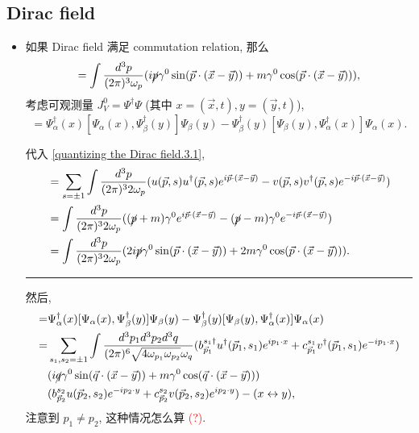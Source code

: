 \subsection{Dirac field}
\begin{itemize}
	\item 如果 Dirac field 满足 commutation relation, 那么
	\begin{equation}
		[\Psi(\vec{x}, t), \Psi^\dag(\vec{y}, t)] = \int \frac{d^3 p}{(2 \pi)^3 \omega_p} (i \cancel{p} \gamma^0 \sin(\vec{p} \cdot (\vec{x} - \vec{y})) + m \gamma^0 \cos(\vec{p} \cdot (\vec{x} - \vec{y}))),
	\end{equation}
	考虑可观测量 $J_V^0 = \Psi^\dag \Psi$ (其中 $x = (\vec{x}, t), y = (\vec{y}, t)$),
	\begin{equation}
		[J_V^0(x), J_V^0(y)] = \Psi^\dag_\alpha(x) [\Psi_\alpha(x), \Psi^\dag_\beta(y)] \Psi_\beta(y) - \Psi^\dag_\beta(y) [\Psi_\beta(y), \Psi^\dag_\alpha(x)] \Psi_\alpha(x).
	\end{equation}
	
	\begin{tcolorbox}[title=calculation:]
		代入 \eqref{quantizing the Dirac field.3.1},
		\begin{align}
			[\Psi(\vec{x}, t), \Psi^\dag(\vec{y}, t)] &= \sum_{s = \pm 1} \int \frac{d^3 p}{(2 \pi)^3 2 \omega_p} (u(\vec{p}, s) u^\dag(\vec{p}, s) e^{i \vec{p} \cdot (\vec{x} - \vec{y})} - v(\vec{p}, s) v^\dag(\vec{p}, s) e^{- i \vec{p} \cdot (\vec{x} - \vec{y})}) \notag \\
			&= \int \frac{d^3 p}{(2 \pi)^3 2 \omega_p} ((\cancel{p} + m) \gamma^0 e^{i \vec{p} \cdot (\vec{x} - \vec{y})} - (\cancel{p} - m) \gamma^0 e^{- i \vec{p} \cdot (\vec{x} - \vec{y})}) \notag \\
			&= \int \frac{d^3 p}{(2 \pi)^3 2 \omega_p} (2 i \cancel{p} \gamma^0 \sin(\vec{p} \cdot (\vec{x} - \vec{y})) + 2 m \gamma^0 \cos(\vec{p} \cdot (\vec{x} - \vec{y}))).
		\end{align}
		
		\noindent\rule[0.5ex]{\linewidth}{0.5pt} %
		
		然后,
		\begin{align}
			[J_V^0(x), J_V^0(y)] =& \Psi^\dag_\alpha(x) [\Psi_\alpha(x), \Psi^\dag_\beta(y)] \Psi_\beta(y) - \Psi^\dag_\beta(y) [\Psi_\beta(y), \Psi^\dag_\alpha(x)] \Psi_\alpha(x) \notag \\
			=& \sum_{s_1, s_2 = \pm 1} \int \frac{d^3 p_1 d^3 p_2 d^3 q}{(2 \pi)^6 \sqrt{4 \omega_{p_1} \omega_{p_2}} \omega_q} (b^{s_1 \dag}_{\vec{p}_1} u^\dag(\vec{p}_1, s_1) e^{i p_1 \cdot x} + c^{s_1}_{\vec{p}_1} v^\dag(\vec{p}_1, s_1) e^{- i p_1 \cdot x}) \notag \\
			& (i \cancel{q} \gamma^0 \sin(\vec{q} \cdot (\vec{x} - \vec{y})) + m \gamma^0 \cos(\vec{q} \cdot (\vec{x} - \vec{y}))) \notag \\
			& (b^{s_2}_{\vec{p}_2} u(\vec{p}_2, s_2) e^{- i p_2 \cdot y} + c^{s_2}_{\vec{p}_2} v(\vec{p}_2, s_2) e^{i p_2 \cdot y}) - (x \leftrightarrow y),
		\end{align}
		注意到 $p_1 \neq p_2$, 这种情况怎么算 \textcolor{red}{(?)}.
	\end{tcolorbox}
\end{itemize}
